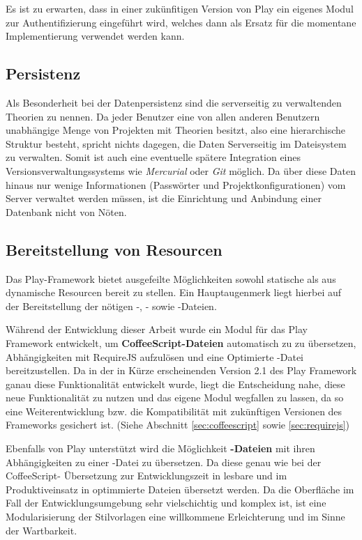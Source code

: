 Es ist zu erwarten, dass in einer zukünfitigen Version von Play ein eigenes Modul zur
Authentifizierung eingeführt wird, welches dann als Ersatz für die momentane Implementierung
verwendet werden kann.

\subsection{Persistenz}

Als Besonderheit bei der Datenpersistenz sind die serverseitig zu verwaltenden Theorien zu nennen.
Da jeder Benutzer eine von allen anderen Benutzern unabhängige Menge von Projekten mit Theorien
besitzt, also eine hierarchische Struktur besteht, spricht nichts dagegen, die Daten Serverseitig im
Dateisystem zu verwalten. Somit ist auch eine eventuelle spätere Integration eines
Versionsverwaltungssystems wie \textit{Mercurial} oder \textit{Git} möglich. Da über diese Daten
hinaus nur wenige Informationen (Passwörter und Projektkonfigurationen) vom Server verwaltet werden
müssen, ist die Einrichtung und Anbindung einer Datenbank nicht von Nöten.

\subsection{Bereitstellung von Resourcen}

Das Play-Framework bietet ausgefeilte Möglichkeiten sowohl statische als aus dynamische Resourcen
bereit zu stellen. Ein Hauptaugenmerk liegt hierbei auf der Bereitstellung der nötigen -,
- sowie -Dateien.

Während der Entwicklung dieser Arbeit wurde ein Modul für das Play Framework entwickelt, um \textbf
{CoffeeScript-Dateien} automatisch zu  zu übersetzen, Abhängigkeiten mit RequireJS
aufzulösen und eine Optimierte -Datei bereitzustellen. Da in der in Kürze erscheinenden
Version 2.1 des Play Framework ganau diese Funktionalität entwickelt wurde, liegt die Entscheidung
nahe, diese neue Funktionalität zu nutzen und das eigene Modul wegfallen zu lassen, da so eine
Weiterentwicklung bzw. die Kompatibilität mit zukünftigen Versionen des Frameworks gesichert ist.
(Siehe Abschnitt \ref{sec:coffeescript} sowie \ref{sec:requirejs})

Ebenfalls von Play unterstützt wird die Möglichkeit  \textbf{-Dateien} mit ihren
Abhängigkeiten zu einer -Datei zu übersetzen. Da diese genau wie bei der CoffeeScript-
Übersetzung zur Entwicklungszeit in lesbare und im Produktiveinsatz in optimmierte Dateien übersetzt
werden. Da die Oberfläche im Fall der Entwicklungsumgebung sehr vielschichtig und komplex ist, ist
eine Modularisierung der Stilvorlagen eine willkommene Erleichterung und im Sinne der Wartbarkeit.


